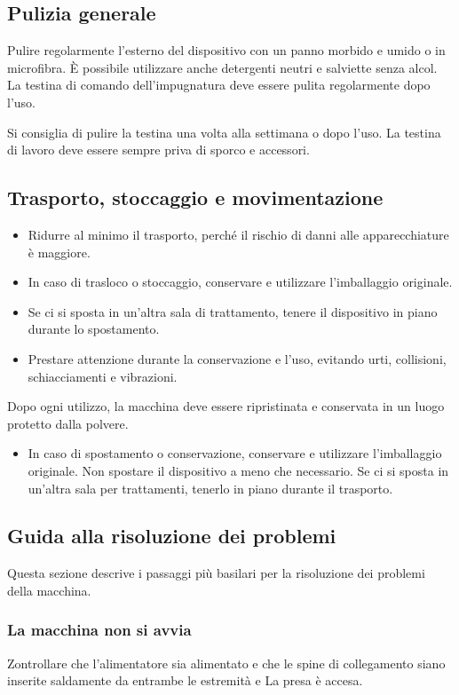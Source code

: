 \documentclass[a4paper]{article}
\begin{document}
\subsection{Pulizia generale}
Pulire regolarmente l'esterno del dispositivo con un panno morbido e umido o in microfibra. È possibile utilizzare anche detergenti neutri e salviette senza alcol. La testina di comando dell'impugnatura deve essere pulita regolarmente dopo l'uso.

Si consiglia di pulire la testina una volta alla settimana o dopo l'uso. La testina di lavoro deve essere sempre priva di sporco e accessori.

\subsection{Trasporto, stoccaggio e movimentazione}
\begin{itemize}
  \item Ridurre al minimo il trasporto, perché il rischio di danni alle apparecchiature è maggiore.
  \item In caso di trasloco o stoccaggio, conservare e utilizzare l'imballaggio originale.
  \item Se ci si sposta in un'altra sala di trattamento, tenere il dispositivo in piano durante lo spostamento.
  \item Prestare attenzione durante la conservazione e l'uso, evitando urti, collisioni, schiacciamenti e vibrazioni.
\end{itemize}

Dopo ogni utilizzo, la macchina deve essere ripristinata e conservata in un luogo protetto dalla polvere.

\begin{itemize}
  \item In caso di spostamento o conservazione, conservare e utilizzare l'imballaggio originale. Non spostare il dispositivo a meno che necessario. Se ci si sposta in un'altra sala per trattamenti, tenerlo in piano durante il trasporto.
\end{itemize}

\subsection{Guida alla risoluzione dei problemi}
Questa sezione descrive i passaggi più basilari per la risoluzione dei problemi della macchina.

\subsubsection{La macchina non si avvia}
Zontrollare che l'alimentatore sia alimentato e che le spine di collegamento siano inserite saldamente da entrambe le estremità e La presa è accesa.
\end{document}
